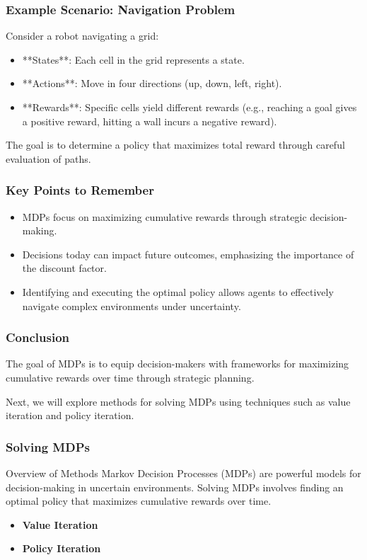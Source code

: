 \documentclass[aspectratio=169]{beamer}
\begin{document}
\begin{frame}[fragile]
    \frametitle{Example Scenario: Navigation Problem}
    Consider a robot navigating a grid:

    \begin{itemize}
        \item **States**: Each cell in the grid represents a state.
        \item **Actions**: Move in four directions (up, down, left, right).
        \item **Rewards**: Specific cells yield different rewards (e.g., reaching a goal gives a positive reward, hitting a wall incurs a negative reward).
    \end{itemize}

    The goal is to determine a policy that maximizes total reward through careful evaluation of paths.
\end{frame}

\begin{frame}[fragile]
    \frametitle{Key Points to Remember}
    \begin{itemize}
        \item MDPs focus on maximizing cumulative rewards through strategic decision-making.
        \item Decisions today can impact future outcomes, emphasizing the importance of the discount factor.
        \item Identifying and executing the optimal policy allows agents to effectively navigate complex environments under uncertainty.
    \end{itemize}
\end{frame}

\begin{frame}[fragile]
    \frametitle{Conclusion}
    The goal of MDPs is to equip decision-makers with frameworks for maximizing cumulative rewards over time through strategic planning.
    
    Next, we will explore methods for solving MDPs using techniques such as value iteration and policy iteration.
\end{frame}

\begin{frame}[fragile]
    \frametitle{Solving MDPs}
    \begin{block}{Overview of Methods}
        Markov Decision Processes (MDPs) are powerful models for decision-making in uncertain environments. Solving MDPs involves finding an optimal policy that maximizes cumulative rewards over time.
    \end{block}
    \begin{itemize}
        \item \textbf{Value Iteration}
        \item \textbf{Policy Iteration}
    \end{itemize}
\end{frame}
\end{document}
